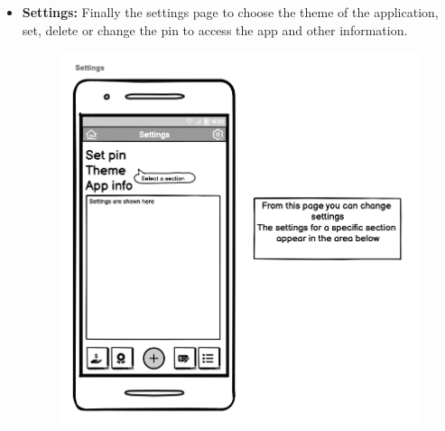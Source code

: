 \documentclass[a4paper,12pt]{article}
\begin{document}
\begin{itemize}
\begin{figure}[H]
    \end{figure}
    \vspace{15cm}
    \item \textbf{Settings:} Finally the settings page to choose the theme of the application, set, delete or change the pin to access the app and other information.
    \begin{figure}[H]
        \centering
        \includegraphics[scale = 0.4]{settmock.png}
    \end{figure}
\end{itemize}
\end{document}
